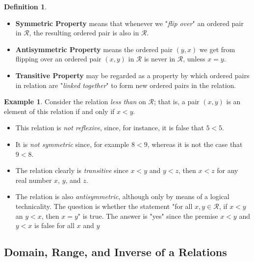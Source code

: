 \documentclass{book}
\theoremstyle{definition}
\newtheorem{definition}{Definition}[section]
\newtheorem{example}{Example}[definition]
\theoremstyle{remark}
\newcommand{\cc}[1]{\mathcal{#1}}
\begin{document}
\begin{definition}
{\begin{itemize}
                \item \textbf{Symmetric Property} means that whenever we "\textit{flip over}" an ordered pair in $\cc{R}$, the resulting ordered pair is also in $\cc{R}$. 
                
                \item \textbf{Antisymmetric Property} means the ordered pair $(y,x)$ we get from flipping over an ordered pair $(x,y)$ in $\cc{R}$ is never in $\cc{R}$, unless $x = y$.
                
                \item \textbf{Transitive Property} may be regarded as a property by which ordered pairs in relation are "\textit{linked together}" to form new ordered pairs in the relation.
            \end{itemize}}
    \end{definition}
    
\newpage
\begin{example}
    Consider the relation \textit{less than} on $\cc{R}$; that is, a pair $(x,y)$ is an element of this relation if and only if $x < y$. 
        \begin{itemize}
            \item This relation is \textit{not reflexive}, since, for  instance, it is false that $5 < 5$. 
            
            \item It is \textit{not symmetric} since, for example $8 < 9$, whereas it is not the case that $9 < 8$. 
            
            \item The relation clearly is \textit{transitive} since $x < y$ and $y < z$, then $x < z$ for any real number $x$, $y$, and $z$.
            
            \item The relation is also \textit{antisymmetric}, although only by means of a logical technicality. The question is whether the statement "for all $x,y \in \cc{R}$, if $x < y$ an $y < x$, then $x=y$" is true. The answer is "yes" since the premise $x < y$ and $y < x$ is false for all $x$ and $y$
        \end{itemize}
\end{example}


\newpage
\subsection{Domain, Range, and Inverse of a Relations}   
    
\end{document}
